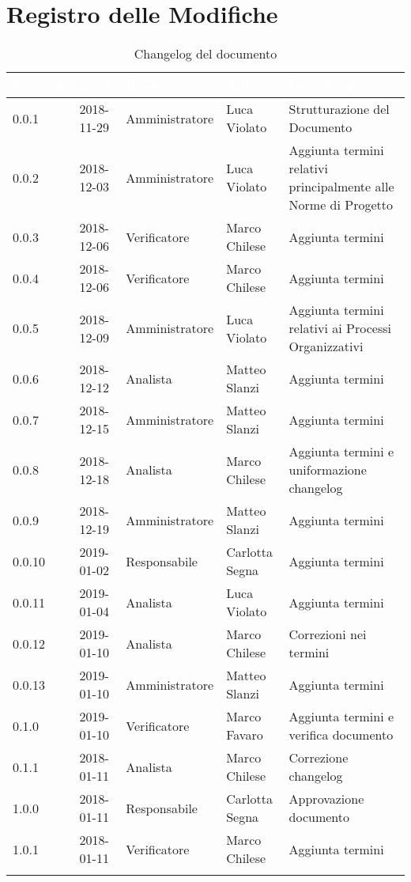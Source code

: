 \section*{Registro delle Modifiche}

\begin{center}
\begin{longtable}[c]{|m{}|m{}|m{}|m{}|p{}|}
\hline
\rowcolor{bluelogo}\textbf{\textcolor{white}{Versione}} & \textbf{\textcolor{white}{Data}} & \textbf{\textcolor{white}{Ruolo}} & \textbf{\textcolor{white}{Autore}} & \textbf{\textcolor{white}{Descrizione}} \\
\hline \hline
\endhead
0.0.1 & 2018-11-29  &Amministratore & Luca Violato & Strutturazione del Documento \\
\hline
\rowcolor{grigio}0.0.2 & 2018-12-03 & Amministratore & Luca Violato & Aggiunta termini relativi principalmente alle Norme di Progetto \\
\hline
0.0.3 & 2018-12-06 & Verificatore  & Marco Chilese & Aggiunta termini\\
\hline 
\rowcolor{grigio}0.0.4 & 2018-12-06 & Verificatore & Marco Chilese & Aggiunta termini\\
\hline
0.0.5 & 2018-12-09 & Amministratore & Luca Violato & Aggiunta termini relativi ai Processi Organizzativi\\
\hline
\rowcolor{grigio}0.0.6 & 2018-12-12 & Analista & Matteo Slanzi & Aggiunta termini\\
\hline
0.0.7 & 2018-12-15 & Amministratore & Matteo Slanzi & Aggiunta termini\\
\hline
\rowcolor{grigio}0.0.8 & 2018-12-18 & Analista & Marco Chilese & Aggiunta termini e uniformazione changelog\\
\hline
0.0.9 & 2018-12-19 & Amministratore & Matteo Slanzi & Aggiunta termini\\
\hline
\rowcolor{grigio} 0.0.10 & 2019-01-02 & Responsabile & Carlotta Segna & Aggiunta termini\\
\hline
0.0.11 & 2019-01-04 & Analista & Luca Violato & Aggiunta termini\\
\hline
\rowcolor{grigio}0.0.12 & 2019-01-10 & Analista & Marco Chilese & Correzioni nei termini\\
\hline
0.0.13 & 2019-01-10 & Amministratore & Matteo Slanzi & Aggiunta termini\\
\hline
\rowcolor{grigio}0.1.0 & 2019-01-10 & Verificatore & Marco Favaro & Aggiunta termini e verifica documento\\
\hline
0.1.1 & 2018-01-11 & Analista & Marco Chilese & Correzione changelog\\
\hline
\rowcolor{grigio}1.0.0 & 2018-01-11 & Responsabile & Carlotta Segna & Approvazione documento \\
\hline
1.0.1 & 2018-01-11 & Verificatore & Marco Chilese & Aggiunta termini\\
\caption{Changelog del documento}
\end{longtable}
\end{center}